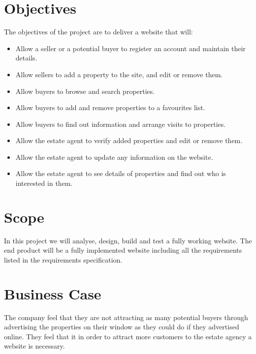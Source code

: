\documentclass[a4paper,12pt]{article}
\begin{document}
 

\section{Objectives}

The objectives of the project are to deliver a website that will:

\begin{itemize}
\item Allow a seller or a potential buyer to register an account and maintain their details.
\item Allow sellers to add a property to the site, and edit or remove them.
\item Allow buyers to browse and search properties.
\item Allow buyers to add and remove properties to a favourites list.
\item Allow buyers to find out information and arrange visits to properties.
\item Allow the estate agent to verify added properties and edit or remove them.
\item Allow the estate agent to update any information on the website.
\item Allow the estate agent to see details of properties and find out who is interested in them.
\end{itemize}

 

\section{Scope}

 

In this project we will analyse, design, build and test a fully working website. The end product will be a fully implemented website including all the requirements listed in the requirements specification.

 

\section{Business Case}

 

The company feel that they are not attracting as many potential buyers through advertising the properties on their window as they could do if they advertised online. They feel that it in order to attract more customers to the estate agency a website is necessary.
\end{document}
